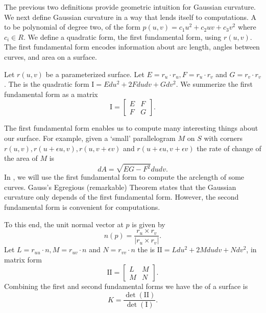 The previous two definitions provide geometric intuition for Gaussian curvature.
We next define Gaussian curvature in a way that lends itself to computations.
A  to be polynomial of degree two, of the form $p(u,v)=c_1u^2+c_2uv+c_3v^2$ 
where $c_i\in R$.
We define a quadratic form, the first fundamental form, using $r(u,v)$.
The first fundamental form encodes information about arc length, angles between curves,
and area on a surface.

Let $r(u,v)$ be a parameterized surface.
Let $E=r_u\cdot r_u, F=r_u\cdot r_v$ and  $G=r_v\cdot r_v$.
The 
is the quadratic form $\mathrm{I}=Edu^2+2Fdudv +Gdv^2$.
We summerize the first fundamental form as a matrix $$\mathrm{I}=\begin{bmatrix}
E & F \\
F & G 
\end{bmatrix}.$$

The first fundamental form enables us to  compute many interesting
things about our surface.
For example,
given a `small' parallelogram $M$ on $S$ with corners $r(u,v),r(u+\epsilon u, v), r(u,v+\epsilon v)$ 
and $r(u+\epsilon u, v+\epsilon v)$ the rate of change of the area of $M$ is 
$$dA=\sqrt{EG-F^2}dudv.$$
In , we will use the first fundamental form to compute the arclength of some curves.
Gauss's Egregious (remarkable) Theorem states that the Gaussian curvature only depends
of the first fundamental form. However, the second fundamental form is convenient for 
computations.

To this end, the unit normal vector at $p$ is given by $$n(p)=\frac{r_u\times r_v}{|r_u\times r_v|}.$$
Let $L=r_{uu}\cdot n, M=r_{uv}\cdot n$ and $N=r_{vv}\cdot n$ the
 is $\mathrm{I\!I}=Ldu^2+2Mdudv+Ndv^2$,
in matrix form $$\mathrm{I\!I}=\begin{bmatrix}
L & M \\
M & N 
\end{bmatrix}.$$
Combining the first and second fundamental forms we have
the  of a surface is
\begin{equation}\label{eqn:curve-dets}
 	K=\frac{\det(\mathrm{I\!I})}{\det(\mathrm{I})}.
\end{equation}

